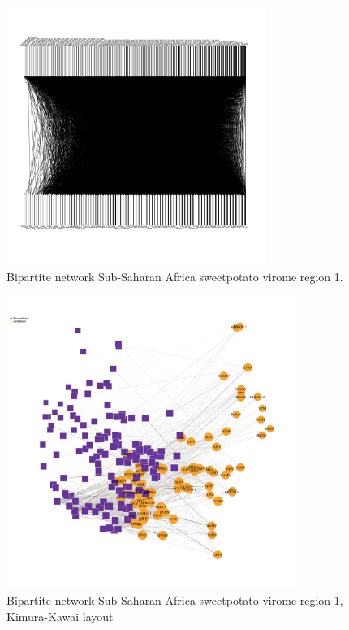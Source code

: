 \documentclass{article}
\begin{document}
\begin{figure}[h!]
\begin{center}
\includegraphics[width=0.75\textwidth]{../results/k-cluster5/5-kcluster_bipartitenetwork_Feb28.pdf
} %
\caption{Bipartite network Sub-Saharan Africa sweetpotato virome region 1.}
\end{center}
\end{figure}



\begin{figure}[h!]
\begin{center}
\includegraphics[width=0.85\textwidth]{../results/k-cluster5/5-kcluster_bipartitenetwork-kk_Feb28.pdf
} %
\caption{Bipartite network Sub-Saharan Africa sweetpotato virome region 1, Kimura-Kawai layout}
\end{center}
\end{figure}
\end{document}
